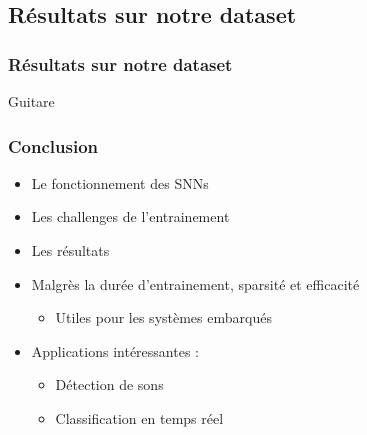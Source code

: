 \documentclass[aspectratio=169]{beamer}
\begin{document}
\subsection{Résultats sur notre dataset}

\begin{frame}
  \frametitle{Résultats sur notre dataset}
  
  Guitare 
\end{frame}

\begin{frame}
  \frametitle{Conclusion}

  \begin{itemize}
    \item Le fonctionnement des SNNs
    \item Les challenges de l'entrainement
    \item Les résultats
    \item Malgrès la durée d'entrainement, sparsité et efficacité
    \begin{itemize}
      \item Utiles pour les systèmes embarqués
    \end{itemize}
    \item Applications intéressantes :
          \begin{itemize}
            \item Détection de sons
            \item Classification en temps réel
          \end{itemize}
    
  \end{itemize}
\end{frame}
\end{document}
